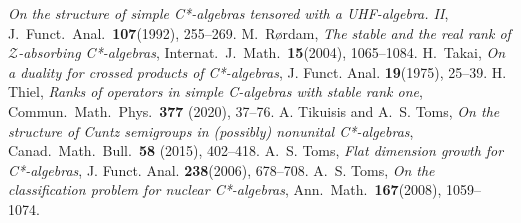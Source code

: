\documentclass[10pt]{amsart}
\numberwithin{equation}{section}
\theoremstyle{definition}
\begin{document}
\begin{thebibliography}{99}
{\emph{On the structure of simple C*-algebras tensored with
   a UHF-algebra. II}},
J.~Funct.\  Anal.\  {\textbf{107}}(1992), 255--269.
%
M.~R{\o}rdam,
{\emph{The stable and the real rank of ${\mathcal{Z}}$-absorbing
 C*-algebras}},
Internat.\  J.\  Math.\  {\textbf{15}}(2004), 1065--1084.
%
 H.\, Takai,
\emph{ On a duality for crossed products of C*-algebras}, J. Funct. Anal. 
\textbf{19}(1975), 25--39.
%
 H. Thiel,
{\emph{Ranks of operators in simple C-algebras with stable rank one}}, Commun.\ Math.\ Phys.\ {\textbf{377}} (2020),
37--76.
%
 A. Tikuisis and A.\, S. Toms,
{\emph{On the structure of Cuntz semigroups in (possibly) nonunital C*-algebras}}, Canad.\  Math.\  Bull.\ {\textbf{58}} (2015),
402--418.
%
% 
 A.\, S. Toms,
\emph{ Flat dimension growth for C*-algebras}, J. Funct. Anal. 
\textbf{ 238}(2006), 678--708.
%
%
 A.\, S. Toms,
{\emph{On the classification problem for nuclear C*-algebras}},
Ann.\  Math.\  {\textbf{167}}(2008), 1059--1074.
%
\end{thebibliography}
\end{document}
